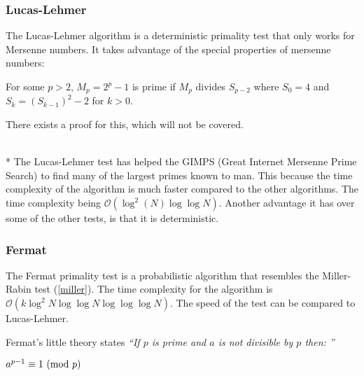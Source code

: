 \documentclass[main.tex]{subfiles}
\begin{document}
\subsubsection{Lucas-Lehmer}
The Lucas-Lehmer algorithm \cite{algh:lucas} is a deterministic primality test
that only works for Mersenne numbers. It takes advantage of the special
properties of mersenne numbers: \newline

\begin{mdframed}
  For some $p>2$, $M_p=2^p-1$ is prime if $M_p$ divides $S_{p-2}$ where $S_0=4$ and
  $S_k=(S_{k-1})^2-2$ for $k>0$.
\end{mdframed}

\begin{center}
  There exists a proof for this, which will not be covered.
\end{center}
\newline
\\*
The Lucas-Lehmer test has helped the GIMPS (Great Internet Mersenne Prime
Search) \cite{GIMPS} to find many of the largest primes known to man. This
because the time complexity of the algorithm is much faster compared to the
other algorithms. The time complexity being $\mathcal{O}(\log^{2}(N) \log \log N)$. Another advantage it has over some
of the other tests, is that it is deterministic.

\subsubsection{Fermat}
The Fermat primality test \cite{algh:fermat} is a probabilistic algorithm that
resembles the Miller-Rabin test (\ref{miller}). The time complexity for the
algorithm is \newline $\mathcal{O}(k
\log^{2}N \log \log N \log \log \log N)$. The speed of the test can be compared to Lucas-Lehmer.

Fermat's little theory \cite{fermat:little} states \textit{``If $p$ is prime and
  $a$ is not divisible by $p$ then: ''} \newline
\begin{mdframed}
  \centering $a^{p - 1} \equiv 1 \ (\mathrm{mod}\ p)$
\end{mdframed}
\end{document}
